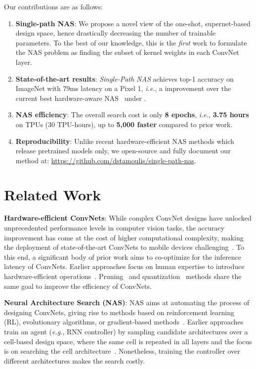 \documentclass[runningheads]{llncs}
\begin{document}
Our contributions are as follows:
\begin{enumerate}

\item \textbf{Single-path NAS}: We propose a novel 
view of the one-shot, supernet-based design space, hence drastically 
decreasing the number of trainable parameters. To the best of our knowledge,
this is the \textit{first} work to formulate the NAS problem 
as finding the subset of kernel weights in each ConvNet layer.

\item  \textbf{State-of-the-art results}: \textit{Single-Path NAS} achieves 
 top-1 accuracy on ImageNet with 79ms latency on a Pixel 1, 
\textit{i.e.}, a  improvement over the current best
hardware-aware NAS~\cite{tan2018mnasnet} under .

\item  \textbf{NAS efficiency}: The overall search cost is only 
\textbf{8 epochs}, \textit{i.e.}, \textbf{3.75 hours} on TPUs  
(30 TPU-hours), up to \textbf{5,000 faster} compared to prior work. 

\item  \textbf{Reproducibility}: Unlike recent hardware-efficient 
NAS methods which release pretrained models only, we open-source and fully document
our method at: \url{https://github.com/dstamoulis/single-path-nas}.

\end{enumerate}

\section{Related Work}

\textbf{Hardware-efficient ConvNets}: While complex ConvNet designs
have unlocked unprecedented performance levels in computer vision tasks,
the accuracy improvement has come at the cost of higher computational 
complexity, making the deployment of state-of-the-art ConvNets to 
mobile devices challenging~\cite{stamoulis2018designing}. To this end, 
a significant body of prior work aims to co-optimize
for the inference latency of ConvNets. Earlier approaches focus on human expertise
to introduce hardware-efficient
operations~\cite{howard2017mobilenets,sandler2018mobilenetv2,zhang1707shufflenet}.
Pruning~\cite{chin2018layer} and quantization~\cite{ding2017lightnn} methods 
share the same goal to improve the efficiency of ConvNets.

\textbf{Neural Architecture Search (NAS)}: NAS aims at 
automating the process of designing ConvNets, giving rise to 
methods based on reinforcement learning (RL), evolutionary 
algorithms, or gradient-based 
methods~\cite{liu2018darts,pham2018efficient,real2018regularized,zoph2016neural,zoph2017learning}.
Earlier approaches train an agent (\textit{e.g.}, RNN controller)
by sampling candidate architectures over a cell-based 
design space, where the same cell is repeated in all layers
and the focus is on searching the cell architecture~\cite{zoph2017learning}. 
Nonetheless, training the controller
over different architectures makes the search costly. 
\end{document}
